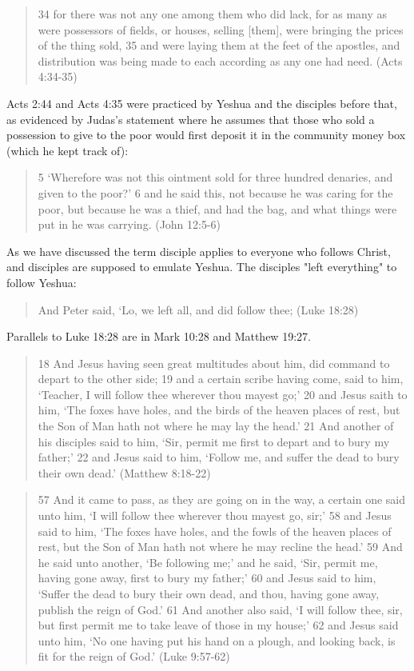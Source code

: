 \documentclass[11pt]{article}
\begin{document}
\begin{quote}
34 for there was not any one among them who did lack, for as many as were possessors of fields, or houses, selling [them], were bringing the prices of the thing sold,
35 and were laying them at the feet of the apostles, and distribution was being made to each according as any one had need. (Acts 4:34-35)
\end{quote}
Acts 2:44 and Acts 4:35 were practiced by Yeshua and the disciples before that, as evidenced by Judas's statement where he assumes that those who sold a possession to give to the poor would first deposit it in the community money box (which he kept track of):
\begin{quote}
5 `Wherefore was not this ointment sold for three hundred denaries, and given to the poor?' 6 and he said this, not because he was caring for the poor, but because he was a thief, and had the bag, and what things were put in he was carrying. (John 12:5-6)
\end{quote}
As we have discussed the term disciple applies to everyone who follows Christ, and disciples are supposed to emulate Yeshua. The disciples "left everything" to follow Yeshua: 
\begin{quote}
And Peter said, `Lo, we left all, and did follow thee;
(Luke 18:28)
\end{quote}
Parallels to Luke 18:28 are in Mark 10:28 and Matthew 19:27.
\begin{quote}
18 And Jesus having seen great multitudes about him, did command to depart to the other side;
19 and a certain scribe having come, said to him, `Teacher, I will follow thee wherever thou mayest go;'
20 and Jesus saith to him, `The foxes have holes, and the birds of the heaven places of rest, but the Son of Man hath not where he may lay the head.'
21 And another of his disciples said to him, `Sir, permit me first to depart and to bury my father;'
22 and Jesus said to him, `Follow me, and suffer the dead to bury their own dead.' (Matthew 8:18-22)\end{quote}
\begin{quote}
57 And it came to pass, as they are going on in the way, a certain one said unto him, `I will follow thee wherever thou mayest go, sir;'
58 and Jesus said to him, `The foxes have holes, and the fowls of the heaven places of rest, but the Son of Man hath not where he may recline the head.'
59 And he said unto another, `Be following me;' and he said, `Sir, permit me, having gone away, first to bury my father;'
60 and Jesus said to him, `Suffer the dead to bury their own dead, and thou, having gone away, publish the reign of God.'
61 And another also said, `I will follow thee, sir, but first permit me to take leave of those in my house;'
62 and Jesus said unto him, `No one having put his hand on a plough, and looking back, is fit for the reign of God.' (Luke 9:57-62)\end{quote}
\end{document}
